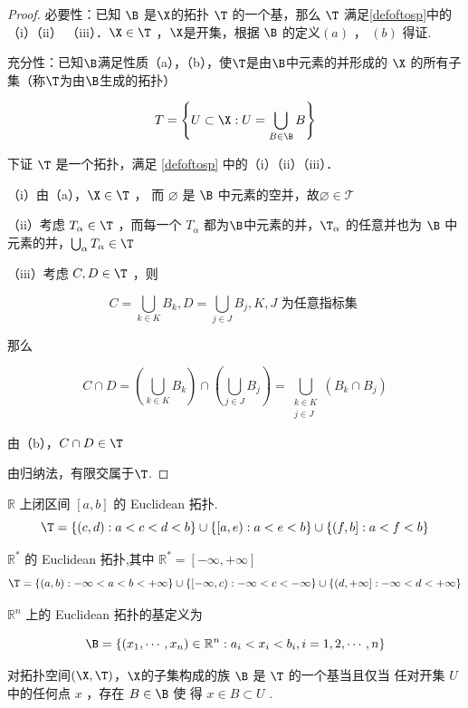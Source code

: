 \begin{proof}
	必要性：已知 $\B$ 是$\X$的拓扑 $\T$ 的一个基，那么 $\T$ 满足\ref{defoftosp}中的（i）（ii） （iii）．$\X \in \T$ ，$\X$是开集，根据 $\B$ 的定义$(a)$ ， $(b)$ 得证.
	
	充分性：已知$\B$满足性质（a），（b），使$\T$是由$\B$中元素的并形成的 $\X$ 的所有子集（称$\T$为由$\B$生成的拓扑）
	
	$$
	T=\left\{U \subset \X: U=\bigcup_{B \in \B} B\right\}
	$$
	
	
	下证 $\T$ 是一个拓扑，满足 \ref{defoftosp} 中的（i）（ii）（iii）．
	
	（i）由（a），$\X \in \T$ ，
	而 $\varnothing$ 是 $\B$ 中元素的空并，故$\varnothing \in \mathcal{T}$
	
	（ii）考虑 $T_\alpha \in \T$ ，而每一个 $T_\alpha$ 都为$\B$中元素的并，$\T_\alpha$ 的任意并也为 $\B$ 中元素的并，$\bigcup_\alpha T_\alpha \in \T$
	
	（iii）考虑 $C, D \in \T$ ，则
	
	$$
	C=\bigcup_{k \in K} B_k, D=\bigcup_{j \in J} B_j, K,J \text { 为任意指标集 }
	$$
	
	
	那么
	
	$$
	C \cap D=\left(\bigcup_{k \in K} B_k\right) \cap\left(\bigcup_{j \in J} B_j\right)=\bigcup_{\substack{k \in K \\ j \in J}}\left(B_k \cap B_j\right)
	$$
	
	
	由（b），$C \cap D \in \T$
	
	由归纳法，有限交属于$\T$.
\end{proof}
$\mathbb{R}$ 上闭区间 $[a, b]$ 的 Euclidean 拓扑.
$$\T=\left\{(c, d): a<c<d<b\right\} \cup\left\{[a, e): a<e<b\right\} \cup\left\{(f, b]: a<f<b\right\}$$


$\mathbb{R}^* $ 的 Euclidean 拓扑,其中 $\mathbb{R}^*=[-\infty,+\infty]$
$$\T=\{(a, b):-\infty<a<b<+\infty\}\cup\{[-\infty, c):-\infty<c<-\infty\}\cup\{(d,+\infty]:-\infty<d<+\infty\}$$

$\mathbb{R}^n$ 上的 Euclidean 拓扑的基定义为

$$
\B=\left\{\left(x_1, \cdots, x_n\right) \in \mathbb{R}^n: a_i<x_i<b_i, i=1,2, \cdots, n\right\}
$$
\begin{proposition}
	\label{th:tp_subset}
	对拓扑空间$(\X,\T)$，$\X$的子集构成的族 $\B$ 是 $\T$ 的一个基当且仅当 任对开集 $U$ 中的任何点 $x$ ，存在 $ B \in \B$ 使 得 $x \in B \subset U$ .
\end{proposition}

